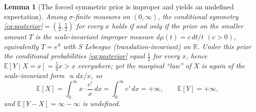 \documentclass{amsart}
\theoremstyle{plain}
\newtheorem{lemma}{Lemma}
\theoremstyle{definition}
\begin{document}
\begin{lemma}[The forced symmetric prior is improper and yields an undefined
expectation]\label{lem:improper}
Among $\sigma$-finite measures on $(0,\infty)$, the conditional symmetry
\eqref{eq:posterior}$=(\tfrac12,\tfrac12)$ for every $x$ holds if and only if
the prior on the smaller amount $T$ is the scale-invariant improper measure
$d\mu(t)=c\,dt/t$ \((c>0)\), equivalently $T=e^{S}$ with $S$ Lebesgue
(translation-invariant) on $\mathbb R$. Under this prior the conditional
probabilities \eqref{eq:posterior} equal $\tfrac12$ for every $x$, hence
$\mathbb E[Y\mid X=x]=\tfrac54x>x$ everywhere; yet the marginal ``law'' of $X$ is
again of the scale-invariant form $\propto dx/x$, so
\[
\mathbb E[X]=\int_0^\infty x\cdot \frac{c'}{x}\,dx=\int_0^\infty c'\,dx=+\infty,
\qquad \mathbb E[Y]=+\infty ,
\]
and $\mathbb E[Y-X]=\infty-\infty$ is undefined.
\end{lemma}
\end{document}
